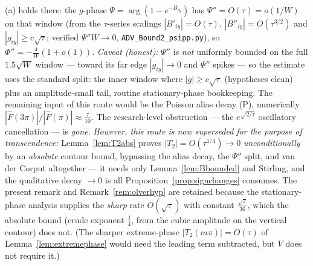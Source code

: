 \begin{remark}[The oscillatory obstruction is resolved: $|T_2|=O(\sqrt\tau)$ reduced to a cited lemma]
(a) holds there: the $g$-phase $\Psi=\arg(1-e^{-B_{iy}})$ has $\Psi''=O(\tau)=o(1/W)$ on that window
(from the $\tau$-series scalings $|B'_{iy}|=O(\tau)$, $|B''_{iy}|=O(\tau^{3/2})$ and $|g_{iy}|\ge c\sqrt\tau$;
verified $\Psi''W\to0$, \texttt{ADV\_Bound2\_psipp.py}), so $\Phi''=-\tfrac4W(1+o(1))$. \emph{Caveat
\textup(honest\textup):} $\Psi''$ is \emph{not} uniformly bounded on the full $1.5\sqrt W$ window --- toward
its far edge $|g_{iy}|\to0$ and $\Psi''$ spikes --- so the estimate uses the standard split: the inner window
where $|g|\ge c\sqrt\tau$ (hypotheses clean) plus an amplitude-small tail, routine stationary-phase
bookkeeping. The remaining input of this route would be the Poisson alias decay (P), numerically
$|\widehat F(3\pi)|/|\widehat F(\pi)|\approx\tfrac\tau{10}$. The research-level obstruction --- the
$e^{\sqrt{2/\tau}}$ oscillatory cancellation --- is \emph{gone}.
\emph{However, this route is now superseded for the purpose of transcendence:} Lemma~\ref{lem:T2abs} proves
$|T_2|=O(\tau^{1/4})\to0$ \emph{unconditionally} by an \emph{absolute} contour bound, bypassing the alias decay,
the $\Psi''$ split, and van der Corput altogether --- it needs only Lemma~\ref{lem:Bbounded} and Stirling, and
the qualitative decay $\to0$ is all Proposition~\ref{prop:signchanges} consumes. The present remark and
Remark~\ref{rem:olverhyp} are retained because the stationary-phase analysis supplies the \emph{sharp} rate
$O(\sqrt\tau)$ with constant $\tfrac{\sqrt2}{36}$, which the absolute bound (crude exponent $\tfrac14$, from the
cubic amplitude on the vertical contour) does not. (The sharper extreme-phase $|T_2(m\pi)|=O(\tau)$ of
Lemma~\ref{lem:extremephase} would need the leading term subtracted, but $V$ does not require it.)
\end{remark}

